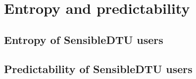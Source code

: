 \chapter{Entropy and predictability}
\section{Entropy of SensibleDTU users}
\section{Predictability of SensibleDTU users}
